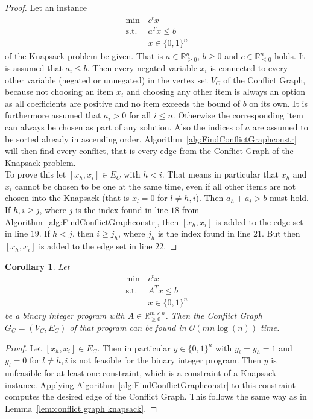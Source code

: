 \documentclass[titlepage, a4paper]{amsbook}
\theoremstyle{plain}
\newtheorem{cor}[thm]{Corollary}
\theoremstyle{break}
\theoremstyle{definition}
\theoremstyle{remark}
\numberwithin{equation}{thm}
\begin{document}
\begin{proof}
Let an instance 
\begin{align*}
    \min\, &c^tx \\
    \text{s.t. } &a^Tx \leq b \\
    &x \in \{0,1\}^n
\end{align*}
of the Knapsack problem be given. That is $a \in \mathbb{R}_{\geq 0}^n$, $b \geq 0$ and $c \in \mathbb{R}_{\leq 0}^n$ holds. It is assumed that $a_i \leq b$. 
Then every negated variable $\bar{x}_i$ is connected to every other variable (negated or unnegated) in the vertex set $V_C$ of the Conflict Graph, because not choosing an item $x_i$ and choosing any other item is always an option as all coefficients are positive and no item exceeds the bound of $b$ on its own.  
It is furthermore assumed that $a_i > 0$ for all $i \leq n$. Otherwise the corresponding item can always be chosen as part of any solution. Also the indices of $a$ are assumed to be sorted already in ascending order. 
Algorithm~\ref{alg:FindConflictGraphconstr} will then find every conflict, that is every edge from the Conflict Graph of the Knapsack problem.  \\
To prove this let $[x_h, x_i] \in E_C$ with $h < i$. That means in particular that $x_h$ and $x_i$ cannot be chosen to be one at the same time, even if all other items are not chosen into the Knapsack (that is $x_l=0$ for $l \neq h,i$). Then $a_h + a_i > b$ must hold. If $h,i \geq j$, where $j$ is the index found in line $18$ from Algorithm~\ref{alg:FindConflictGraphconstr}, then $[x_h,x_i]$ is added to the edge set in line $19$. If $h < j$, then $i \geq j_h$, where $j_h$ is the index found in line $21$. But then $[x_h, x_i]$ is added to the edge set in line $22$.  
\end{proof}
\begin{cor}
Let \begin{align*}
    \min\, &c^tx \\
    \text{s.t. } &A^Tx \leq b \\
    &x \in \{0,1\}^n
\end{align*}
be a binary integer program with $A \in \mathbb{R}_{\geq 0}^{m \times n}$. Then the Conflict Graph $G_C=(V_C, E_C)$ of that program can be found in $\mathcal{O}(m n \log(n))$ time.
\end{cor}
\begin{proof}
Let $[x_h,x_i] \in E_C$. Then in particular $y \in \{0,1\}^n$ with $y_i=y_h=1$ and $y_l=0$ for $l \neq h,i$ is not feasible for the binary integer program. Then $y$ is unfeasible for at least one constraint, which is a constraint of a Knapsack instance. Applying Algorithm~\ref{alg:FindConflictGraphconstr} to this constraint computes the desired edge of the Conflict Graph. This follows the same way as in Lemma~\ref{lem:conflict graph knapsack}.
\end{proof}
\end{document}
